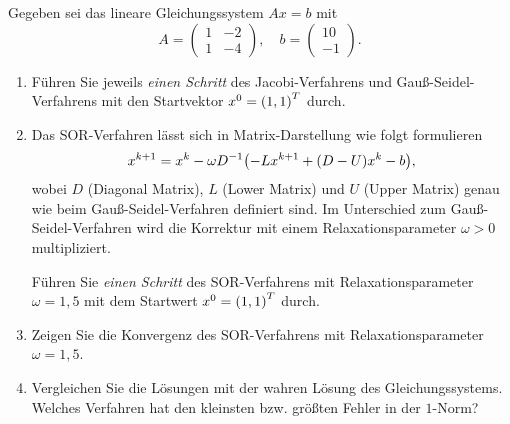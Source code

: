 \documentclass{exercise}
\begin{document}
    \begin{problem}
        Gegeben sei das lineare Gleichungssystem \(Ax = b\) mit
        \[
            A = \begin{pmatrix}
                1 & -2\\
                1 & -4
            \end{pmatrix}, \quad b = \begin{pmatrix}
                10\\
                -1
            \end{pmatrix}.
        \]
        \begin{enumerate}
            \item Führen Sie jeweils \emph{einen Schritt} des Jacobi-Verfahrens und Gauß-Seidel-Verfahrens mit den Startvektor \(x^0 = \parentheses*{1, 1}^T\) durch.
            \item Das SOR-Verfahren lässt sich in Matrix-Darstellung wie folgt formulieren
            \[
                x^{k + 1} = x^k - \omega D^{-1}\parentheses*{-Lx^{k + 1} + \parentheses*{D - U}x^k - b},
            \]
            wobei \(D\) (Diagonal Matrix), \(L\) (Lower Matrix) und \(U\) (Upper Matrix) genau wie beim Gauß-Seidel-Verfahren definiert sind.
            Im Unterschied zum Gauß-Seidel-Verfahren wird die Korrektur mit einem Relaxationsparameter \(\omega > 0\) multipliziert.

            Führen Sie \emph{einen Schritt} des SOR-Verfahrens mit Relaxationsparameter \(\omega = 1,5\) mit dem Startwert \(x^0 = \parentheses*{1, 1}^T\) durch.
            \item Zeigen Sie die Konvergenz des SOR-Verfahrens mit Relaxationsparameter \(\omega = 1,5\).
            \item Vergleichen Sie die Lösungen mit der wahren Lösung des Gleichungssystems.
            Welches Verfahren hat den kleinsten bzw. größten Fehler in der \(1\)-Norm?
        \end{enumerate}
    \end{problem}
    
\end{document}
